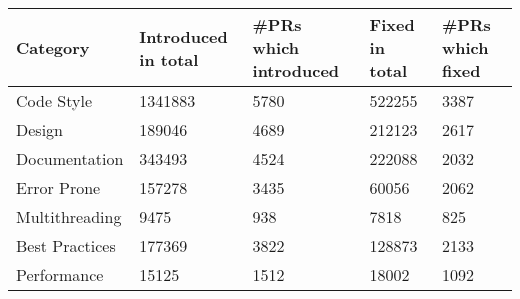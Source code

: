 \begin{tabular}{|p{2cm}p{2cm}p{2cm}p{2cm}p{2cm}|}
  \hline
Category & Introduced in total & \#PRs which introduced & Fixed in total & \#PRs which fixed \\ 
  \hline \hline
Code Style & 1341883 & 5780 & 522255 & 3387 \\ 
  Design & 189046 & 4689 & 212123 & 2617 \\ 
  Documentation & 343493 & 4524 & 222088 & 2032 \\ 
  Error Prone & 157278 & 3435 & 60056 & 2062 \\ 
  Multithreading & 9475 & 938 & 7818 & 825 \\ 
  Best Practices & 177369 & 3822 & 128873 & 2133 \\ 
  Performance & 15125 & 1512 & 18002 & 1092 \\ 
   \hline
\end{tabular}
